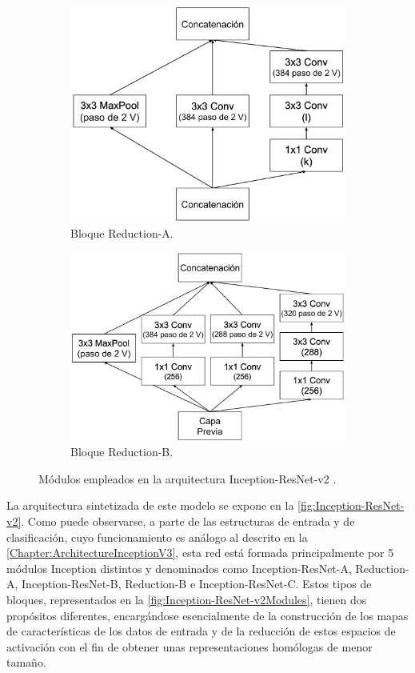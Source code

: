 \begin{figure}
    \vspace{1cm}
    \begin{subfigure}[t]{.45\textwidth}
      \centering
      \includegraphics[width=.9\linewidth]{Images/Reduction-A.png}
      \caption{Bloque Reduction-A.}
      \label{fig:Reduction-A}
    \end{subfigure}
    \hfill
    \begin{subfigure}[t]{.45\textwidth}
      \centering
      \includegraphics[width=.9\linewidth]{Images/Reduction-B.png}
      \caption{Bloque Reduction-B.}
      \label{fig:Reduction-B}
    \end{subfigure}
    \caption{Módulos empleados en la arquitectura Inception-ResNet-v2 \cite{Inception-ResNet}.}
    \label{fig:Inception-ResNet-v2Modules}
\end{figure}

La arquitectura sintetizada de este modelo se expone en la \autoref{fig:Inception-ResNet-v2}. Como puede observarse, a parte de las estructuras de entrada y de clasificación, cuyo funcionamiento es análogo al descrito en la \autoref{Chapter:ArchitectureInceptionV3}, esta red está formada principalmente por 5 módulos Inception distintos y denominados como Inception-ResNet-A, Reduction-A, Inception-ResNet-B, Reduction-B e Inception-ResNet-C. Estos tipos de bloques, representados en la \autoref{fig:Inception-ResNet-v2Modules}, tienen dos propósitos diferentes, encargándose esencialmente de la construcción de los mapas de características de los datos de entrada y de la reducción de estos espacios de activación con el fin de obtener unas representaciones homólogas de menor tamaño. 

